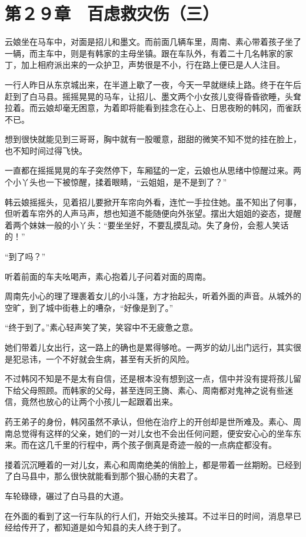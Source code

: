 \section{第２９章　百虑救灾伤（三）}

云娘坐在马车中，对面是招儿和墨文。而前面几辆车里，周南、素心带着孩子坐了一辆，而主车中，则是有韩家的主母坐镇。跟在车队外，有着二十几名韩家的家丁，加上相府派出来的一众护卫，声势很是不小，行在路上便已是人人注目。

一行人昨日从东京城出来，在半道上歇了一夜，今天一早就继续上路。终于在午后赶到了白马县。摇摇晃晃的马车，让招儿、墨文两个小女孩儿变得昏昏欲睡，头耷拉着。而云娘却毫无困意，为着即将能看到挂念在心上、日思夜盼的韩冈，而雀跃不已。

想到很快就能见到三哥哥，胸中就有一股暖意，甜甜的微笑不知不觉的挂在脸上，也不知时间过得飞快。

一直都在摇摇晃晃的车子突然停下，车厢猛的一定，云娘也从思绪中惊醒过来。两个小丫头也一下被惊醒，揉着眼睛，“云姐姐，是不是到了？”

韩云娘摇摇头，见着招儿要掀开车帘向外看，连忙一手拉住她。虽不知出了何事，但听着车帘外的人声马声，想也知道不能随便向外张望。摆出大姐姐的姿态，提醒着两个妹妹一般的小丫头：“要坐坐好，不要乱摸乱动。失了身份，会惹人笑话的！”

“到了吗？”

听着前面的车夫吆喝声，素心抱着儿子问着对面的周南。

周南先小心的理了理裹着女儿的小斗篷，方才抬起头，听着外面的声音。从城外的空旷，到了城中街巷上的嘈杂，“好像是到了。”

“终于到了。”素心轻声笑了笑，笑容中不无疲惫之意。

她们带着儿女出行，这一路上的确也是累得够呛。一两岁的幼儿出门远行，其实很是犯忌讳，一个不好就会生病，甚至有夭折的风险。

不过韩冈不知是不是太有自信，还是根本没有想到这一点，信中并没有提将孩儿留下给父母照顾。而韩家的父母，甚至连同王旖、素心、周南都对鬼神之说有些迷信，竟然也放心的让两个小孩儿一起跟着出来。

药王弟子的身份，韩冈虽然不承认，但他在治疗上的开创却是世所难及。素心、周南总觉得有这样的父亲，她们的一对儿女也不会出任何问题，便安安心心的坐车东来。而在这几千里的行程中，两个孩子倒真是奇迹一般的一点病症都没有。

搂着沉沉睡着的一对儿女，素心和周南绝美的俏脸上，都是带着一丝期盼。已经到了白马县中，那么很快就能看到那个狠心肠的夫君了。

车轮碌碌，碾过了白马县的大道。

在外面的看到了这一行车队的行人们，开始交头接耳。不过半日的时间，消息早已经给传开了，都知道是如今知县的夫人终于到了。

